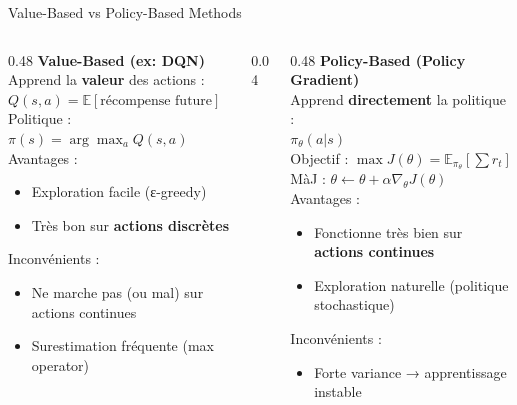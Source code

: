 \documentclass{beamer}
\begin{document}
\begin{frame}{Value-Based vs Policy-Based Methods}

\begin{columns}[T]

\begin{column}{0.48\textwidth}
\textbf{Value-Based (ex: DQN)}\\
\small
Apprend la \textbf{valeur} des actions :\\[0.4em]
$ Q(s,a) = \mathbb{E}[\text{récompense future}] $\\[0.6em]

Politique : $\pi(s) = \arg\max_a Q(s,a)$\\[0.8em]

\small
Avantages :
\begin{itemize}
    \item Exploration facile (ε-greedy)
    \item Très bon sur \textbf{actions discrètes}
\end{itemize}

Inconvénients :
\begin{itemize}
    \item Ne marche pas (ou mal) sur actions continues
    \item Surestimation fréquente (max operator)
\end{itemize}

\end{column}

\begin{column}{0.04\textwidth}
    \phantom{x}
\end{column}

\begin{column}{0.48\textwidth}
\textbf{Policy-Based (Policy Gradient)}\\
\small
Apprend \textbf{directement} la politique :\\[0.4em]
$ \pi_\theta(a|s) $\\[0.6em]

Objectif : $\max J(\theta) = \mathbb{E}_{\pi_\theta}[\sum r_t]$\\[0.6em]

MàJ : $\theta \leftarrow \theta + \alpha \nabla_\theta J(\theta)$\\[0.8em]

\small
Avantages :
\begin{itemize}
    \item Fonctionne très bien sur \textbf{actions continues}
    \item Exploration naturelle (politique stochastique)
\end{itemize}

Inconvénients :
\begin{itemize}
    \item Forte variance → apprentissage instable
\end{itemize}

\end{column}

\end{columns}

\end{frame}
\end{document}
